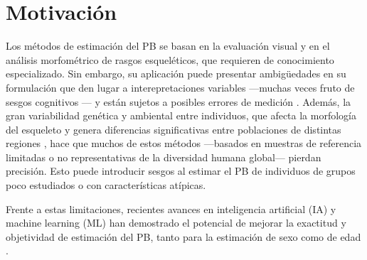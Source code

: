 

\section{Motivación}

Los métodos de estimación del PB se basan en la evaluación visual y en el análisis morfométrico de rasgos 
esqueléticos, que requieren de conocimiento especializado. Sin embargo, su aplicación puede presentar 
ambigüedades en su formulación que den lugar a interepretaciones variables ---muchas veces fruto de sesgos 
cognitivos \cite{nakhaeizadeh2014, cooper2019}--- y están sujetos a posibles errores de medición 
\cite{langley2018}.
Además, la gran variabilidad genética y ambiental entre individuos, que afecta la morfología del esqueleto y 
genera diferencias significativas entre poblaciones de distintas regiones \cite{ubelaker2017}, hace que muchos 
de estos métodos ---basados en muestras de referencia limitadas o no representativas de la diversidad humana 
global--- pierdan precisión. Esto puede introducir sesgos al estimar el PB de individuos de 
grupos poco estudiados o con características atípicas.

Frente a estas limitaciones, recientes avances en inteligencia artificial (IA) y machine learning (ML) han 
demostrado el potencial de mejorar la exactitud y objetividad de estimación del PB, tanto para la estimación 
de sexo \cite{curate2017, darmawan2015, pinto2016} como de edad \cite{kim2017, larson2018, lee2017}.

